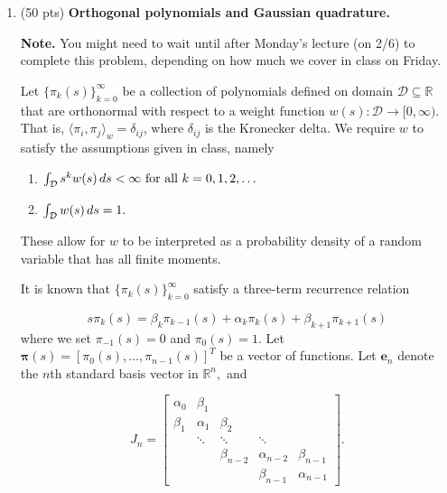 \documentclass[11pt,letterpaper,twoside]{article}
\newcommand{\R}{\mathbb{R}}
\begin{document}
\begin{enumerate}
\bigskip

\item (50 pts) \textbf{Orthogonal polynomials and Gaussian quadrature.}

\textbf{Note.} You might need to wait until after Monday's lecture (on 2/6) to complete this problem, depending on how much we cover in class on Friday.
\medskip

Let $\{ \pi_k(s) \}_{k = 0}^\infty$ be a collection of polynomials defined on domain $\mathcal{D} \subseteq \R$ that are orthonormal with respect to a weight function $w(s):\mathcal{D} \rightarrow [0, \infty)$. That is, $\langle \pi_i, \pi_j \rangle_w = \delta_{i j}$, where $\delta_{ij}$ is the Kronecker delta. We require $w$ to satisfy the assumptions given in class, namely
\begin{enumerate}
\item $\int_{\mathcal{D}}  s^k w(s) \thinspace ds < \infty \text{ for all } k = 0,1,2,\ldots$
\item $\int_{\mathcal{D}} w(s) \thinspace ds  = 1.$
\end{enumerate}

These allow for $w$ to be interpreted as a probability density of a random variable that has all finite moments. 

\medskip

It is known that $\{\pi_k(s)\}_{k = 0}^\infty$ satisfy a three-term recurrence relation

\begin{equation}
s \pi_k(s) = \beta_k \pi_{k -1}(s) + \alpha_k \pi_k(s) + \beta_{k + 1} \pi_{k + 1} (s) \label{3-term}
\end{equation}
where we set $\pi_{-1}(s) = 0$ and $\pi_0(s) = 1.$ Let $\bm{\pi}(s) = [\pi_0(s), \ldots, \pi_{n-1}(s)]^T$ be a vector of functions. Let $\bm{e}_n$ denote the $n$th standard basis vector in $\R^n,$ and

\[ J_n = \begin{bmatrix}  \alpha_0 & \beta_1 &  		         &                     & \\
		                       \beta_1 & \alpha_1 & \beta_2       &                     & \\ 
		                                    & \ddots     & \ddots         & \ddots           & \\
		                                    &                & \beta_{n-2} & \alpha_{n-2} & \beta_{n-1} \\
		                                    &		    &			 & \beta_{n-1}   & \alpha_{n-1} \end{bmatrix}. \] 


\end{enumerate}
\end{document}
